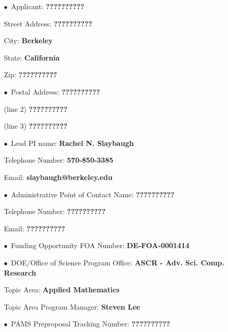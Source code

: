 \documentclass[12pt]{article}
\begin{document}
\begin{itemize}[noitemsep,topsep=0pt,parsep=-2pt,partopsep=20pt,labelwidth=7.5cm,align=left,
itemindent=7.5cm]
\item[$\bullet$\, Applicant:] 					{\bf ??????????}
\item[\quad Street Address:] 					{\bf ??????????}
\item[\quad City:] 									{\bf Berkeley}
\item[\quad State:] 								{\bf California}
\item[\quad Zip:] 									{\bf ??????????}\vspace{12pt}
\item[$\bullet$\, Postal Address:] 			{\bf ??????????}
\item[\quad (line 2)] 								{\bf ??????????}
\item[\quad (line 3)] 								{\bf ??????????}\vspace{12pt}
\item[$\bullet$\, Lead PI name:] 			{\bf Rachel N. Slaybaugh}
\item[\quad Telephone Number:]			{\bf 570-850-3385}
\item[\quad Email:]									{\bf slaybaugh@berkeley.edu}\vspace{12pt}
\item[$\bullet$\, Administrative Point of Contact Name:] {\bf ??????????}
\item[\quad Telephone Number:]			{\bf ??????????}
\item[\quad Email:]									{\bf ??????????}\vspace{12pt}
\item[$\bullet$\, Funding Opportunity FOA Number:] {\bf DE-FOA-0001414}\vspace{8pt}
\item[$\bullet$\, DOE/Office of Science Program Office:] {\bf ASCR - Adv. Sci.
 Comp. Research}
\item[\quad Topic Area:]							{\bf Applied Mathematics}
\item[\quad Topic Area Program Manager:] {\bf Steven Lee}\vspace{12pt}
\item[$\bullet$\, PAMS Preproposal Tracking Number:] {\bf ??????????}
\end{itemize}

\pagebreak

\end{document}
